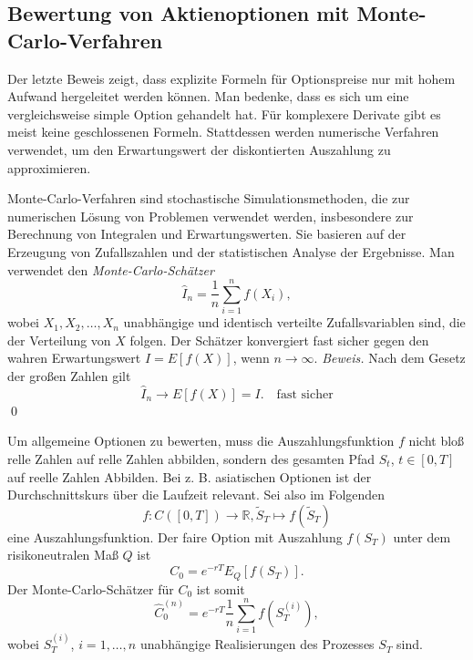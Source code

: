 \subsection{Bewertung von Aktienoptionen mit Monte-Carlo-Verfahren}
Der letzte Beweis zeigt, dass explizite Formeln für Optionspreise nur mit hohem
Aufwand hergeleitet werden können. Man bedenke, dass es sich um eine 
vergleichsweise simple Option gehandelt hat. Für komplexere Derivate
gibt es meist keine geschlossenen Formeln. Stattdessen werden numerische Verfahren
verwendet, um den Erwartungswert der diskontierten Auszahlung zu approximieren.

\begin{defprop}
Monte-Carlo-Verfahren sind stochastische Simulationsmethoden, die zur numerischen
Lösung von Problemen verwendet werden, insbesondere zur Berechnung von Integralen
und Erwartungswerten. Sie basieren auf der Erzeugung von Zufallszahlen und
der statistischen Analyse der Ergebnisse. Man verwendet den \textit{Monte-Carlo-Schätzer}
$$
\hat{I}_n = \frac{1}{n} \sum_{i=1}^n f(X_i),
$$
wobei $X_1, X_2, \ldots, X_n$ unabhängige und identisch verteilte Zufallsvariablen
sind, die der Verteilung von $X$ folgen. Der Schätzer konvergiert fast sicher
gegen den wahren Erwartungswert $I = E[f(X)]$, wenn $n \to \infty$.
\textit{Beweis.} Nach dem Gesetz der großen Zahlen gilt
$$\hat{I}_n \longrightarrow E[f(X)] = I. \quad \text{fast sicher}$$
\qed
\end{defprop}

\begin{lemma}
Um allgemeine Optionen zu bewerten, muss die Auszahlungsfunktion $f$
nicht bloß relle Zahlen auf relle Zahlen abbilden, sondern des gesamten Pfad
$S_t$, $t\in[0,T]$ auf reelle Zahlen Abbilden. Bei z. B. asiatischen Optionen ist
der Durchschnittskurs über die Laufzeit relevant.
Sei also im Folgenden 
$$f: C([0,T]) \to \mathbb R, \tilde S_T \mapsto f(\tilde S_T)$$
eine Auszahlungsfunktion. Der faire Option mit Auszahlung $f(S_T)$
unter dem risikoneutralen Maß $Q$ ist
$$
C_0 = e^{-rT} E_Q[f(S_T)].
$$
Der Monte-Carlo-Schätzer für $C_0$ ist somit
$$
\hat{C}_0^{(n)} = e^{-rT} \frac{1}{n} \sum_{i=1}^n f(S_T^{(i)}),
$$
wobei $S_T^{(i)}$, $i=1,\ldots,n$ unabhängige Realisierungen des Prozesses $S_T$ sind.

\end{lemma}

